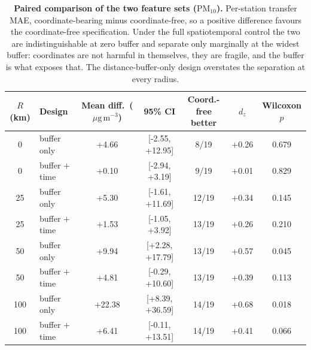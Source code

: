 \documentclass[11pt]{article}
\newcommand*{\ugm}{\ensuremath{\mu\mathrm{g\,m^{-3}}}}
\newcommand*{\pmten}{\ensuremath{\mathrm{PM_{10}}}}
\begin{document}
\begin{table}[htbp]\centering\footnotesize
\caption{\textbf{Paired comparison of the two feature sets (\pmten{}).} Per-station transfer MAE, coordinate-bearing minus coordinate-free, so a positive difference favours the coordinate-free specification. Under the full spatiotemporal control the two are indistinguishable at zero buffer and separate only marginally at the widest buffer: coordinates are not harmful in themselves, they are fragile, and the buffer is what exposes that. The distance-buffer-only design overstates the separation at every radius.}
\begin{tabular}{clccccc}\toprule
$R$ (km) & Design & Mean diff.\ (\ugm) & 95\% CI & Coord.-free better & $d_z$ & Wilcoxon $p$ \\ \midrule
0 & buffer only & +4.66 & [-2.55, +12.95] & 8/19 & +0.26 & 0.679 \\
0 & buffer $+$ time & +0.10 & [-2.94, +3.19] & 9/19 & +0.01 & 0.829 \\
25 & buffer only & +5.30 & [-1.61, +11.69] & 12/19 & +0.34 & 0.145 \\
25 & buffer $+$ time & +1.53 & [-1.05, +3.92] & 13/19 & +0.26 & 0.210 \\
50 & buffer only & +9.94 & [+2.28, +17.79] & 13/19 & +0.57 & 0.045 \\
50 & buffer $+$ time & +4.81 & [-0.29, +10.60] & 13/19 & +0.39 & 0.113 \\
100 & buffer only & +22.38 & [+8.39, +36.59] & 14/19 & +0.68 & 0.018 \\
100 & buffer $+$ time & +6.41 & [-0.11, +13.51] & 14/19 & +0.41 & 0.066 \\
\bottomrule\end{tabular}\end{table}
\end{document}
